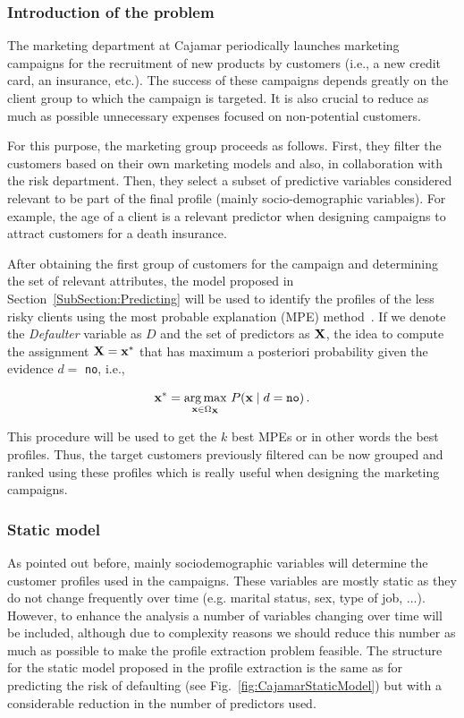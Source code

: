 \subsubsection*{Introduction of the problem}

The marketing department at Cajamar periodically launches marketing campaigns for the recruitment of new products by customers (i.e., a new credit card, an insurance, etc.). The success of these campaigns depends greatly on the client group to which the campaign is targeted. It is also crucial to reduce as much as possible unnecessary expenses focused on non-potential customers. 

For this purpose, the marketing group proceeds as follows. First, they filter the customers based on their own marketing models and also, in collaboration with the risk department. Then, they select a subset of predictive variables considered relevant to be part of the final profile (mainly socio-demographic variables). For example, the age of a client is a relevant predictor when designing campaigns to attract customers for a death insurance. 

After obtaining the first group of customers for the campaign and determining the set of relevant attributes, the model proposed in Section~\ref{SubSection:Predicting} will be used to identify the profiles of the less risky clients using the most probable explanation (MPE) method~\cite{pearl1988probabilistic}. If we denote the \emph{Defaulter} variable as $D$ and  the set of predictors as $\mathbf{X}$, the idea to compute the assignment $\mathbf{X} = \mathbf{x}^{*}$ that has maximum a posteriori probability given the evidence $d=$ \texttt{no}, i.e., 

\begin{equation}
\mathbf{x}^{*} = \underset{\mathbf{x}\in\Omega_{\mathbf{X}}} {\mathrm{arg\,max}} ~ P(\mathbf{x}\mid d = \texttt{no})\, .
\label{eq:MPE}
\end{equation}

This procedure will be used to get the $k$ best MPEs or in other words the best profiles. Thus, the target customers previously filtered can be now grouped and ranked using these profiles which is really useful when designing the marketing campaigns.

\subsubsection*{Static model}
\label{sec:StaticModel}

As pointed out before, mainly sociodemographic variables will determine the customer profiles used in the campaigns. These variables are mostly static as they do not change frequently over time (e.g. marital status, sex, type of job, ...). However, to enhance the analysis a number of  variables changing over time will be included, although due to complexity reasons we should reduce this number as much as possible to make the profile extraction problem feasible.
The structure for the static model proposed in the profile extraction is the same as for predicting the risk of defaulting (see Fig.~\ref{fig:CajamarStaticModel}) but with a considerable reduction in the number of predictors used. 

